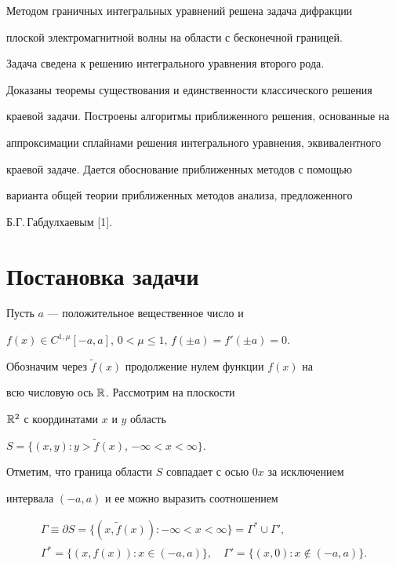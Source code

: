 Методом граничных интегральных уравнений решена задача дифракции


плоской электромагнитной волны на области с бесконечной границей.


Задача сведена к решению интегрального уравнения второго рода.


Доказаны теоремы существования и единственности классического решения


краевой задачи. Построены алгоритмы приближенного решения, основанные на


аппроксимации сплайнами решения интегрального уравнения, эквивалентного


краевой задаче. Дается обоснование приближенных методов с помощью


варианта общей теории приближенных методов анализа, предложенного


Б.Г.\,Габдулхаевым [1].





\section{Постановка задачи}





Пусть $a$ --- положительное вещественное число и


$f (x) \in C^{1,\mu} [-a,a]$, $0<\mu\le1$, $f(\pm a) = f' (\pm a) = 0$.


Обозначим через $\widetilde{f} (x)$ продолжение нулем функции $f (x)$ на


всю числовую ось $\Bbb R$. Рассмотрим на плоскости


$\Bbb R^2$ с координатами $x$ и $y$ область


$S = \{ (x,y) : y > \widetilde{f} (x)$, $-\infty < x <\infty \}$.


Отметим, что граница области $S$ совпадает с осью $0x$ за исключением


интервала $(-a,a)$ и ее можно выразить соотношением


\begin{gather*}


\Gamma \equiv \partial S = \{(x,\widetilde{f}(x)) : -\infty < x <\infty\} =


\Gamma^\ast \cup \Gamma', \\


%


\Gamma^\ast = \{(x,f(x)) : x \in (-a,a)\}, \quad


\Gamma' = \{ (x,0) : x \not\in (-a,a)\}.


\end{gather*}





